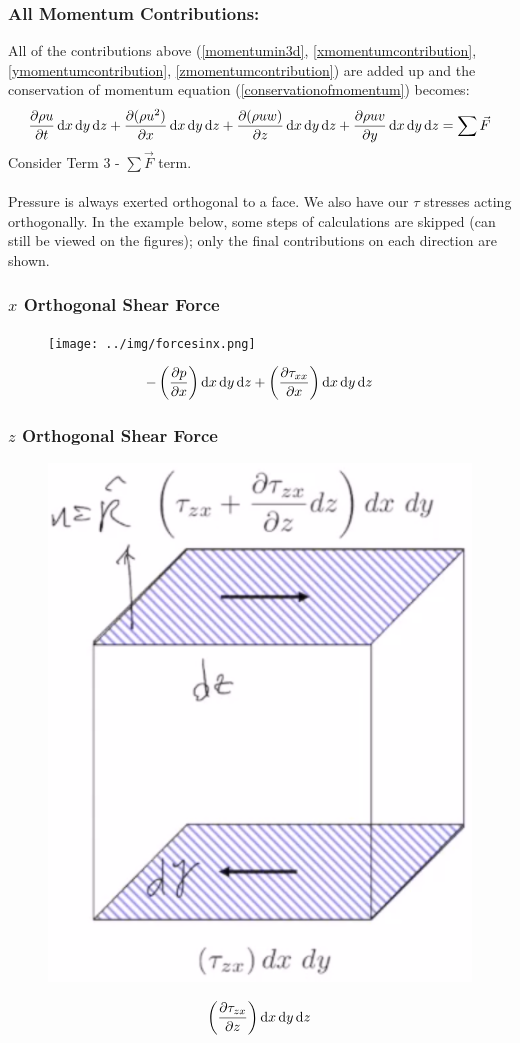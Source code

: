 \documentclass[class=report, crop=false, 12pt,a4paper]{standalone}
\begin{document}
\subsubsection{All Momentum Contributions:}
All of the contributions above (\ref{momentumin3d}, \ref{xmomentumcontribution}, \ref{ymomentumcontribution}, \ref{zmomentumcontribution}) are added up and the conservation of momentum equation (\ref{conservationofmomentum}) becomes:
\begin{equation}
  \frac{\partial \rho u}{\partial t}\dif x \dif y \dif z + \frac{\partial(\rho u^2)}{\partial x} \dif x \dif y \dif z + \frac{\partial (\rho u w)}{\partial z} \dif x \dif y \dif z + \frac{\partial \rho u v}{\partial y} \dif x \dif y \dif z = \sum \vec{F}
\end{equation}
Consider Term 3 - $\sum \vec{F}$ term. \\\\
Pressure is always exerted orthogonal to a face. We also have our $\tau$ stresses acting orthogonally. In the example below, some steps of calculations are skipped (can still be viewed on the figures); only the final contributions on each direction are shown.
\subsubsection{$x$ Orthogonal Shear Force}
\begin{figure}[H]
  \centering
  \texttt{[image: ../img/forcesinx.png]}
\end{figure}
\begin{equation}
  - \left( \frac{\partial p}{\partial x} \right) \dif x \dif y \dif z + \left( \frac{\partial \tau_{xx}}{\partial x} \right) \dif x \dif y \dif z
\end{equation}
\subsubsection{$z$ Orthogonal Shear Force}
\begin{figure}[H]
  \centering
  \includegraphics[width = 0.3 \textwidth]{../img/forceinxz.png}
\end{figure}
\begin{equation}
  \left( \frac{\partial \tau_{zx}}{\partial z} \right) \dif x \dif y \dif z
\end{equation}
\end{document}
